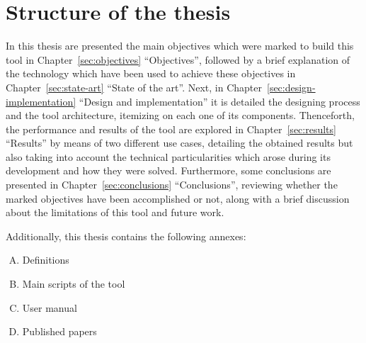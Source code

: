 \documentclass[a4paper, 12pt]{book}
\begin{document}
\section{Structure of the thesis}
\label{sec:structure}
In this thesis are presented the main objectives which were marked to build this tool in Chapter~\ref{sec:objectives} ``Objectives'',
followed by a brief explanation of the technology which have been used to achieve these objectives in Chapter~\ref{sec:state-art} ``State of the art''.
Next, in Chapter~\ref{sec:design-implementation} ``Design and implementation'' it is detailed the designing process and the tool architecture, itemizing on each one of its components.
Thenceforth, the performance and results of the tool are explored in Chapter~\ref{sec:results} ``Results'' by means of two different use cases,
detailing the obtained results but also taking into account the technical particularities which arose during its development and how they were solved.
Furthermore, some conclusions are presented in Chapter~\ref{sec:conclusions} ``Conclusions'', reviewing whether the marked objectives have been accomplished or not,
along with a brief discussion about the limitations of this tool and future work.\par
Additionally, this thesis contains the following annexes:
\begin{enumerate}[A.]
  \item Definitions
  \item Main scripts of the tool
  \item User manual
  \item Published papers
\end{enumerate}
\cleardoublepage
\end{document}
